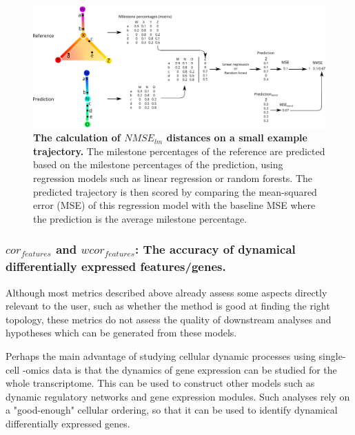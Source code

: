 \begin{figure}[htb!]
	\centering\includegraphics[width=\linewidth]{fig/snote1fig_7.pdf}
	\caption{
		\textbf{The calculation of $\textit{NMSE}_{\textit{lm}}$ distances on a small example trajectory.} 
		The milestone percentages of the reference are predicted based on the milestone percentages of the prediction, using regression models such as linear regression or random forests. The predicted trajectory is then scored by comparing the mean-squared error (MSE) of this regression model with the baseline MSE where the prediction is the average milestone percentage.
	}
	\label{fig:snote1fig_7}
\end{figure}

\subsubsection{$\textit{cor}_{\textit{features}}$ and $\textit{wcor}_{\textit{features}}$: The accuracy of dynamical differentially expressed features/genes.}

Although most metrics described above already assess some aspects directly relevant to the user, such as whether the method is good at finding the right topology, these metrics do not assess the quality of downstream analyses and hypotheses which can be generated from these models. 

Perhaps the main advantage of studying cellular dynamic processes using single-cell -omics data is that the dynamics of gene expression can be studied for the whole transcriptome. This can be used to construct other models such as dynamic regulatory networks and gene expression modules. Such analyses rely on a "good-enough" cellular ordering, so that it can be used to identify dynamical differentially expressed genes.

